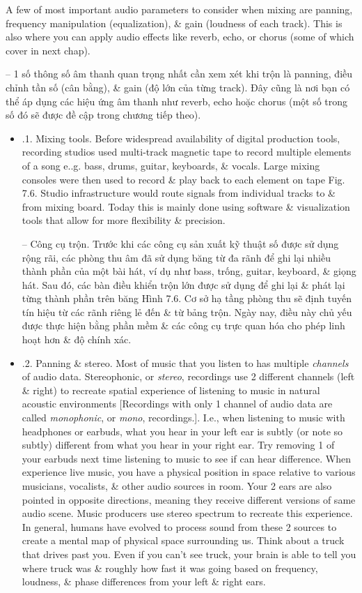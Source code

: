 \documentclass{article}
\begin{document}
\begin{itemize}
\begin{itemize}
		A few of most important audio parameters to consider when mixing are panning, frequency manipulation (equalization), \& gain (loudness of each track). This is also where you can apply audio effects like reverb, echo, or chorus (some of which cover in next chap).
		
		-- 1 số thông số âm thanh quan trọng nhất cần xem xét khi trộn là panning, điều chỉnh tần số (cân bằng), \& gain (độ lớn của từng track). Đây cũng là nơi bạn có thể áp dụng các hiệu ứng âm thanh như reverb, echo hoặc chorus (một số trong số đó sẽ được đề cập trong chương tiếp theo).
		\begin{itemize}
			\item {.1. Mixing tools.} Before widespread availability of digital production tools, recording studios used multi-track magnetic tape to record multiple elements of a song e..g. bass, drums, guitar, keyboards, \& vocals. Large mixing consoles were then used to record \& play back to each element on tape {\sf Fig. 7.6}. Studio infrastructure would route signals from individual tracks to \& from mixing board. Today this is mainly done using software \& visualization tools that allow for more flexibility \& precision.
			
			-- {\sf Công cụ trộn.} Trước khi các công cụ sản xuất kỹ thuật số được sử dụng rộng rãi, các phòng thu âm đã sử dụng băng từ đa rãnh để ghi lại nhiều thành phần của một bài hát, ví dụ như bass, trống, guitar, keyboard, \& giọng hát. Sau đó, các bàn điều khiển trộn lớn được sử dụng để ghi lại \& phát lại từng thành phần trên băng {\sf Hình 7.6}. Cơ sở hạ tầng phòng thu sẽ định tuyến tín hiệu từ các rãnh riêng lẻ đến \& từ bảng trộn. Ngày nay, điều này chủ yếu được thực hiện bằng phần mềm \& các công cụ trực quan hóa cho phép linh hoạt hơn \& độ chính xác.
			\item {.2. Panning \& stereo.} Most of music that you listen to has multiple {\it channels} of audio data. Stereophonic, or {\it stereo}, recordings use 2 different channels (left \& right) to recreate spatial experience of listening to music in natural acoustic environments [Recordings with only 1 channel of audio data are called {\it monophonic}, or {\it mono}, recordings.]. I.e., when listening to music with headphones or earbuds, what you hear in your left ear is subtly (or note so subtly) different from what you hear in your right ear. Try removing 1 of your earbuds next time listening to music to see if can hear difference. When experience live music, you have a physical position in space relative to various musicians, vocalists, \& other audio sources in room. Your 2 ears are also pointed in opposite directions, meaning they receive different versions of same audio scene. Music producers use stereo spectrum to recreate this experience. In general, humans have evolved to process sound from these 2 sources to create a mental map of physical space surrounding us. Think about a truck that drives past you. Even if you can't see truck, your brain is able to tell you where truck was \& roughly how fast it was going based on frequency, loudness, \& phase differences from your left \& right ears.
			

\end{itemize}
\end{itemize}
\end{itemize}
\end{document}
